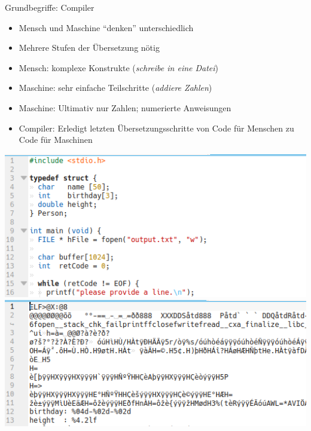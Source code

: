\begin{frame}
%
\begin{minipage}[T]{.49\linewidth}
\begin{Large}
{Grundbegriffe: Compiler}
\end{Large}
\begin{itemize}
\item Mensch und Maschine \enquote{denken} unterschiedlich
\item Mehrere Stufen der Übersetzung nötig
\item Mensch: komplexe Konstrukte (\emph{schreibe in eine Datei})
\item Maschine: sehr einfache Teilschritte (\emph{addiere Zahlen})
\item Maschine: Ultimativ nur Zahlen; numerierte Anweisungen
\item Compiler: Erledigt letzten Übersetzungsschritte von Code für Menschen zu Code für Maschinen
\end{itemize}
\end{minipage}
%
\begin{minipage}{.49\linewidth}
\includegraphics[width=\linewidth]{./gfx/CodeRaw}
\includegraphics[width=\linewidth]{./gfx/CodeCompiled}
\end{minipage}
%
\end{frame}


